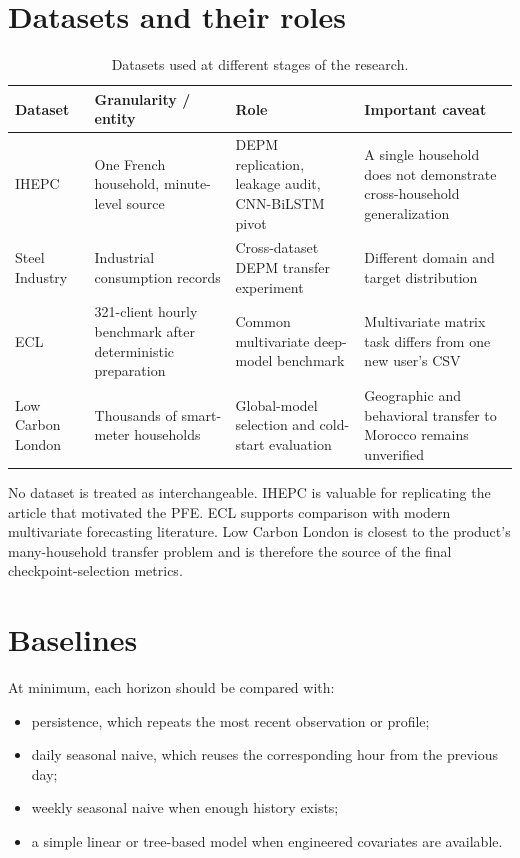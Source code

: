 \section{Datasets and their roles}

\begin{table}[H]
\centering
\caption{Datasets used at different stages of the research.}
\label{tab:datasets}
\begin{tabularx}{\textwidth}{p{}p{}YY}
\toprule
Dataset & Granularity / entity & Role & Important caveat \\
\midrule
IHEPC \cite{uci_ihepc} & One French household, minute-level source & DEPM replication, leakage audit, CNN-BiLSTM pivot & A single household does not demonstrate cross-household generalization \\
Steel Industry & Industrial consumption records & Cross-dataset DEPM transfer experiment & Different domain and target distribution \\
ECL \cite{uci_ecl} & 321-client hourly benchmark after deterministic preparation & Common multivariate deep-model benchmark & Multivariate matrix task differs from one new user's CSV \\
Low Carbon London \cite{lcl_dataset} & Thousands of smart-meter households & Global-model selection and cold-start evaluation & Geographic and behavioral transfer to Morocco remains unverified \\
\bottomrule
\end{tabularx}
\end{table}

No dataset is treated as interchangeable. IHEPC is valuable for replicating the article that motivated the PFE. ECL supports comparison with modern multivariate forecasting literature. Low Carbon London is closest to the product's many-household transfer problem and is therefore the source of the final checkpoint-selection metrics.

\section{Baselines}

At minimum, each horizon should be compared with:
\begin{itemize}
  \item persistence, which repeats the most recent observation or profile;
  \item daily seasonal naive, which reuses the corresponding hour from the previous day;
  \item weekly seasonal naive when enough history exists;
  \item a simple linear or tree-based model when engineered covariates are available.
\end{itemize}

